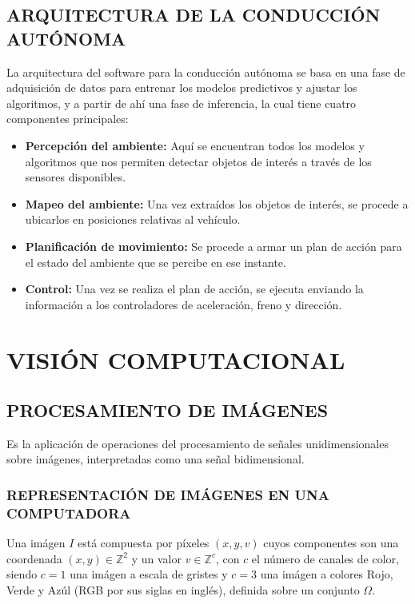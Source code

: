     \subsection{ARQUITECTURA DE LA CONDUCCIÓN AUTÓNOMA}
    La arquitectura del software para la conducción autónoma se basa en una fase de adquisición de datos para entrenar los modelos predictivos y ajustar los algoritmos, y a partir de ahí una fase de inferencia, la cual tiene cuatro componentes principales:
    
    \begin{itemize}[nosep]
        \item \textbf{Percepción del ambiente:} Aquí se encuentran todos los modelos y algoritmos que nos permiten detectar objetos de interés a través de los sensores disponibles.
        \item \textbf{Mapeo del ambiente:} Una vez extraídos los objetos de interés, se procede a ubicarlos en posiciones relativas al vehículo.
        \item \textbf{Planificación de movimiento:} Se procede a armar un plan de acción para el estado del ambiente que se percibe en ese instante.
        \item \textbf{Control:} Una vez se realiza el plan de acción, se ejecuta enviando la información a los controladores de aceleración, freno y dirección.
    \end{itemize}
    
\section{VISIÓN COMPUTACIONAL}
    
    \subsection{PROCESAMIENTO DE IMÁGENES}
        Es la aplicación de operaciones del procesamiento de señales unidimensionales sobre imágenes, interpretadas como una señal bidimensional.
        \subsubsection{REPRESENTACIÓN DE IMÁGENES EN UNA COMPUTADORA}
        Una imágen $I$ está compuesta por píxeles $(x, y, v)$ cuyos componentes son una coordenada $(x, y) \in \mathbb{Z}^2$ y un valor $v \in \mathbb{Z}^c$, con $c$ el número de canales de color, siendo $c=1$ una imágen a escala de gristes y $c=3$ una imágen a colores Rojo, Verde y Azúl (RGB por sus siglas en inglés), definida sobre un conjunto $\Omega$. 
        
